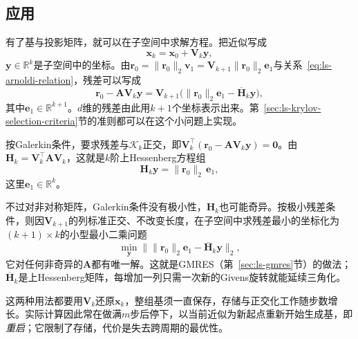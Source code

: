 \subsection{应用}
\label{sec:ls-arnoldi-application}

有了基与投影矩阵，就可以在子空间中求解方程。把近似写成
\[
 \bm x_k=\bm x_0+\bm V_k\bm y ,
\]
$\bm y\in\mathbb R^k$是子空间中的坐标。由$\bm r_0=\lVert\bm r_0\rVert_2\bm v_1=\bm V_{k+1}\lVert\bm r_0\rVert_2\bm e_1$与关系~\eqref{eq:ls-arnoldi-relation}，残差可以写成
\begin{equation}
 \bm r_0-\bm A\bm V_k\bm y=\bm V_{k+1}\bigl(\lVert\bm r_0\rVert_2\bm e_1-\overline{\bm H}_k\bm y\bigr),
 \label{eq:ls-arnoldi-residual-coordinates}
\end{equation}
其中$\bm e_1\in\mathbb R^{k+1}$。$d$维的残差由此用$k+1$个坐标表示出来。第~\ref{sec:ls-krylov-selection-criteria}节的准则都可以在这个小问题上实现。

按Galerkin条件，要求残差与$\mathcal K_k$正交，即$\bm V_k^\top(\bm r_0-\bm A\bm V_k\bm y)=\bm 0$。由$\bm H_k=\bm V_k^\top\bm A\bm V_k$，这就是$k$阶上Hessenberg方程组
\begin{equation}
 \bm H_k\bm y=\lVert\bm r_0\rVert_2\,\bm e_1 ,
 \label{eq:ls-arnoldi-galerkin-system}
\end{equation}
这里$\bm e_1\in\mathbb R^k$。

不过对非对称矩阵，Galerkin条件没有极小性，$\bm H_k$也可能奇异。按极小残差条件，则因$\bm V_{k+1}$的列标准正交、不改变长度，在子空间中求残差最小的坐标化为$(k+1)\times k$的小型最小二乘问题
\begin{equation}
 \min_{\bm y}\bigl\lVert\lVert\bm r_0\rVert_2\bm e_1-\overline{\bm H}_k\bm y\bigr\rVert_2 ,
 \label{eq:ls-arnoldi-minimal-residual-problem}
\end{equation}
它对任何非奇异的$\bm A$都有唯一解。这就是GMRES（第~\ref{sec:ls-gmres}节）的做法；$\overline{\bm H}_k$是上Hessenberg矩阵，每增加一列只需一次新的Givens旋转就能延续三角化。

这两种用法都要用$\bm V_k$还原$\bm x_k$，整组基须一直保存，存储与正交化工作随步数增长。实际计算因此常在做满$m$步后停下，以当前近似为新起点重新开始生成基，即\emph{重启}；它限制了存储，代价是失去跨周期的最优性。
